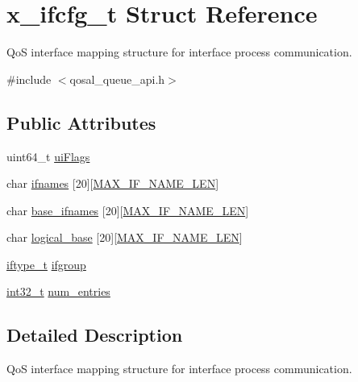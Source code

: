 \hypertarget{structx__ifcfg__t}{\section{x\-\_\-ifcfg\-\_\-t Struct Reference}
\label{structx__ifcfg__t}
}


Qo\-S interface mapping structure for interface process communication.  




{\ttfamily \#include $<$qosal\-\_\-queue\-\_\-api.\-h$>$}

\subsection*{Public Attributes}
\begin{DoxyCompactItemize}
\item 
uint64\-\_\-t \hyperlink{structx__ifcfg__t_a8fd8c601b8624f82b34eb96673726d48}{ui\-Flags}
\item 
char \hyperlink{structx__ifcfg__t_aac5a55bd377922f0fd0f56f6b0b4ab43}{ifnames} \mbox{[}20\mbox{]}\mbox{[}\hyperlink{group__FAPI__QOS__GENERAL_ga53a5c7c867e818bc8b6dea3105a90f62}{M\-A\-X\-\_\-\-I\-F\-\_\-\-N\-A\-M\-E\-\_\-\-L\-E\-N}\mbox{]}
\item 
char \hyperlink{structx__ifcfg__t_accff1ffe5db8d5f6d96b007b8bff2157}{base\-\_\-ifnames} \mbox{[}20\mbox{]}\mbox{[}\hyperlink{group__FAPI__QOS__GENERAL_ga53a5c7c867e818bc8b6dea3105a90f62}{M\-A\-X\-\_\-\-I\-F\-\_\-\-N\-A\-M\-E\-\_\-\-L\-E\-N}\mbox{]}
\item 
char \hyperlink{structx__ifcfg__t_a09e6a73488b8c4dd93a4202fe11f954e}{logical\-\_\-base} \mbox{[}20\mbox{]}\mbox{[}\hyperlink{group__FAPI__QOS__GENERAL_ga53a5c7c867e818bc8b6dea3105a90f62}{M\-A\-X\-\_\-\-I\-F\-\_\-\-N\-A\-M\-E\-\_\-\-L\-E\-N}\mbox{]}
\item 
\hyperlink{group__FAPI__QOS__GENERAL_ga23c1893cfe6a7875c1a418338c6f09ad}{iftype\-\_\-t} \hyperlink{structx__ifcfg__t_a465fac74e7e1a3c4a255e7ad550c7fd2}{ifgroup}
\item 
\hyperlink{commondefs_8h_a32f2e37ee053cf2ce8ca28d1f74630e5}{int32\-\_\-t} \hyperlink{structx__ifcfg__t_ad6a9705c42a0090aa7ed0d4a6b9b1a55}{num\-\_\-entries}
\end{DoxyCompactItemize}


\subsection{Detailed Description}
Qo\-S interface mapping structure for interface process communication. 


